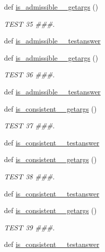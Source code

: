 \begin{DoxyCompactItemize}
\item 
def \hyperlink{namespacetests_a8ef465e006793910d03d231ac472328d}{is\+\_\+admissible\+\_\+\_\+getargs} ()
\begin{DoxyCompactList}\small\item\em T\+E\+S\+T 35 \#\#\#. \end{DoxyCompactList}\item 
def \hyperlink{namespacetests_a7c62c6eb8349c3fa1142f275095d7ab8}{is\+\_\+admissible\+\_\+\_\+testanswer}
\item 
def \hyperlink{namespacetests_acfd2f8c48fed3f6d83c2784cc6eaf431}{is\+\_\+admissible\+\_\+\_\+getargs} ()
\begin{DoxyCompactList}\small\item\em T\+E\+S\+T 36 \#\#\#. \end{DoxyCompactList}\item 
def \hyperlink{namespacetests_a287e6fb3cd0678a41a9ed1e2248bf63d}{is\+\_\+admissible\+\_\+\_\+testanswer}
\item 
def \hyperlink{namespacetests_a4b3878302a4666816258cd2aef82b3a3}{is\+\_\+consistent\+\_\+\_\+getargs} ()
\begin{DoxyCompactList}\small\item\em T\+E\+S\+T 37 \#\#\#. \end{DoxyCompactList}\item 
def \hyperlink{namespacetests_a5dd96e9f5c8a20c2f97fa9a82d76c688}{is\+\_\+consistent\+\_\+\_\+testanswer}
\item 
def \hyperlink{namespacetests_af2a6de4f5bd9bad5319b927a0314a291}{is\+\_\+consistent\+\_\+\_\+getargs} ()
\begin{DoxyCompactList}\small\item\em T\+E\+S\+T 38 \#\#\#. \end{DoxyCompactList}\item 
def \hyperlink{namespacetests_ade41ae0b3228797c978bd486db1bd30d}{is\+\_\+consistent\+\_\+\_\+testanswer}
\item 
def \hyperlink{namespacetests_ac0c2a89db273f83db24b87fde09e48c0}{is\+\_\+consistent\+\_\+\_\+getargs} ()
\begin{DoxyCompactList}\small\item\em T\+E\+S\+T 39 \#\#\#. \end{DoxyCompactList}\item 
def \hyperlink{namespacetests_abc48bb632c3bfca4fd3c61bd64f23170}{is\+\_\+consistent\+\_\+\_\+testanswer}
\item 

\end{DoxyCompactItemize}
